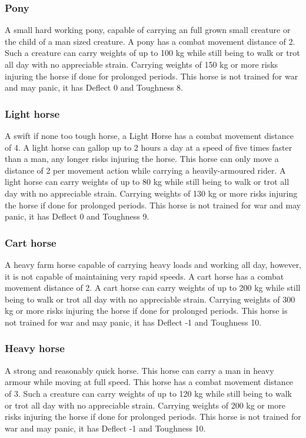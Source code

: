 \documentclass[a4paper,11pt,oneside]{book}
\begin{document}
\subsubsection*{Pony}
A small hard working pony, capable of carrying an full grown small creature or the child of a man sized creature. A pony has a combat movement distance of 2. Such a creature can carry weights of up to 100 kg while still being to walk or trot all day with no appreciable strain. Carrying weights of 150 kg or more risks injuring the horse if done for prolonged periods. This horse is not trained for war and may panic, it has Deflect 0 and Toughness 8.

\subsubsection*{Light horse}
A swift if none too tough horse, a Light Horse has a combat movement distance of 4. A light horse can gallop up to 2 hours a day at a speed of five times faster than a man, any longer risks injuring the horse. This horse can only move a distance of 2 per movement action while carrying a heavily-armoured rider. A light horse can carry weights of up to 80 kg while still being to walk or trot all day with no appreciable strain. Carrying weights of 130 kg or more risks injuring the horse if done for prolonged periods. This horse is not trained for war and may panic, it has Deflect 0 and Toughness 9.

\subsubsection*{Cart horse}
A heavy farm horse capable of carrying heavy loads and working all day, however, it is not capable of maintaining very rapid speeds. A cart horse has a combat movement distance of 2. A cart horse can carry weights of up to 200 kg while still being to walk or trot all day with no appreciable strain. Carrying weights of 300 kg or more risks injuring the horse if done for prolonged periods. This horse is not trained for war and may panic, it has Deflect -1 and Toughness 10.

\subsubsection*{Heavy horse}
A strong and reasonably quick horse. This horse can carry a man in heavy armour while moving at full speed. This horse has a combat movement distance of 3. Such a creature can carry weights of up to 120 kg while still being to walk or trot all day with no appreciable strain. Carrying weights of 200 kg or more risks injuring the horse if done for prolonged periods. This horse is not trained for war and may panic, it has Deflect -1 and Toughness 10.
\end{document}
